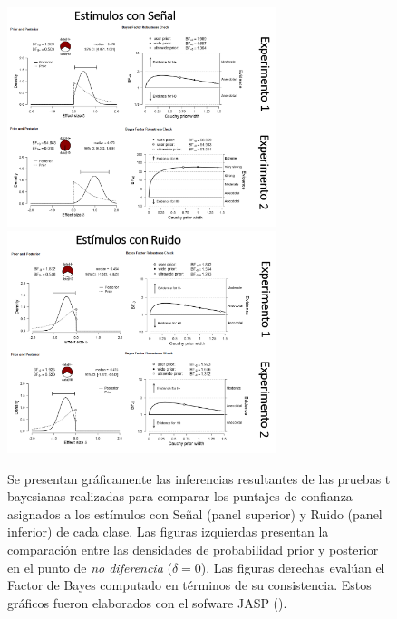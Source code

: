 \begin{figure}[p]
\centering
\includegraphics[width=0.7\textwidth]{Figures/JASP_Tbayesian_Signals}\\ 
\includegraphics[width=0.7\textwidth]{Figures/JASP_Tbayesian_Noise}\\ 
\decoRule
\caption[Densidad posterior e interpretación de la evidencia acumulada en favor de la diferencia entre los puntajes registrados por cada clase, de acuerdo con una prueba t bayesiana]{Se presentan gráficamente las inferencias resultantes de las pruebas t bayesianas realizadas para comparar los puntajes de confianza asignados a los estímulos con Señal (panel superior) y Ruido (panel inferior) de cada clase. Las figuras izquierdas presentan la comparación entre las densidades de probabilidad prior y posterior en el punto de \textit{no diferencia} ($\delta = 0$). Las figuras derechas evalúan el Factor de Bayes computado en términos de su consistencia. Estos gráficos fueron elaborados con el sofware JASP (\citeyear{JASP}).}
\label{fig:JASP_Tbayesian}
\end{figure}

